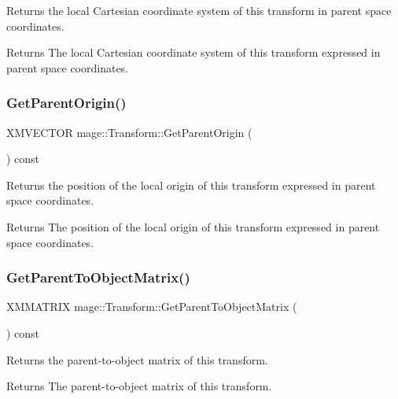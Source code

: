 Returns the local Cartesian coordinate system of this transform in parent space coordinates.

\begin{DoxyReturn}{Returns}
The local Cartesian coordinate system of this transform expressed in parent space coordinates. 
\end{DoxyReturn}
\hypertarget{structmage_1_1_transform_a4c33d968669e0342bdff3582825549ae}{}\label{structmage_1_1_transform_a4c33d968669e0342bdff3582825549ae} 
\subsubsection{\texorpdfstring{Get\+Parent\+Origin()}{GetParentOrigin()}}
{\footnotesize\ttfamily X\+M\+V\+E\+C\+T\+OR mage\+::\+Transform\+::\+Get\+Parent\+Origin (\begin{DoxyParamCaption}{ }\end{DoxyParamCaption}) const}

Returns the position of the local origin of this transform expressed in parent space coordinates.

\begin{DoxyReturn}{Returns}
The position of the local origin of this transform expressed in parent space coordinates. 
\end{DoxyReturn}
\hypertarget{structmage_1_1_transform_a66eee9c51ff050924d35c3747083593f}{}\label{structmage_1_1_transform_a66eee9c51ff050924d35c3747083593f} 
\subsubsection{\texorpdfstring{Get\+Parent\+To\+Object\+Matrix()}{GetParentToObjectMatrix()}}
{\footnotesize\ttfamily X\+M\+M\+A\+T\+R\+IX mage\+::\+Transform\+::\+Get\+Parent\+To\+Object\+Matrix (\begin{DoxyParamCaption}{ }\end{DoxyParamCaption}) const}

Returns the parent-\/to-\/object matrix of this transform.

\begin{DoxyReturn}{Returns}
The parent-\/to-\/object matrix of this transform. 
\end{DoxyReturn}
\hypertarget{structmage_1_1_transform_a30a0464b1bd2fb37d6b5cc2155323a14}{}\label{structmage_1_1_transform_a30a0464b1bd2fb37d6b5cc2155323a14} 
